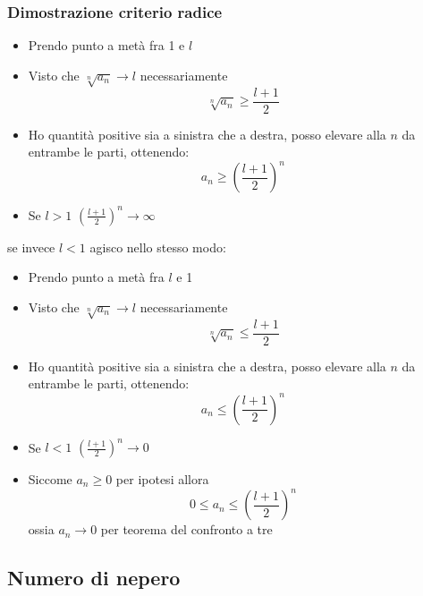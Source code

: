 \subsubsection{Dimostrazione criterio radice}
\begin{itemize}
	\item Prendo punto a metà fra 1 e $l$
	\item Visto che $\sqrt[n]{a_n} \to l$ necessariamente 
	\[
	\sqrt[n]{a_n} \ge \frac{l+1}{2}
	\] 
	\item Ho quantità positive sia a sinistra che a destra, posso elevare alla $n$ da entrambe le parti, ottenendo:
\[
a_n \ge \left( \frac{l+1}{2} \right) ^{n}
\] 
	\item Se $l > 1$ $\left( \frac{l+1}{2} \right)^{n}  \to \infty$
\end{itemize}
\hr
se invece $l<1$ agisco nello stesso modo:
\begin{itemize}
	\item Prendo punto a metà fra $l$ e 1
	\item Visto che $\sqrt[n]{a_n} \to l$ necessariamente 
	\[
	\sqrt[n]{a_n} \le \frac{l+1}{2}
	\] 
	\item Ho quantità positive sia a sinistra che a destra, posso elevare alla $n$ da entrambe le parti, ottenendo:
\[
a_n \le \left( \frac{l+1}{2} \right) ^{n}
\] 
	\item Se $l < 1$ $\left( \frac{l+1}{2} \right)^{n}  \to 0$
	\item Siccome $a_n \ge 0$ per ipotesi allora 
	\[
	0 \le a_n \le \left( \frac{l+1}{2} \right) ^{n}
	\] 
	ossia $a_n \to 0$ per teorema del confronto a tre
\end{itemize}
\subsection{Numero di nepero}
